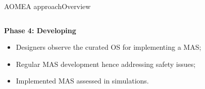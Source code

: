 \begin{frame}{AOMEA approach}{Overview}

    \begin{columns}

        \begin{column}{0.6\textwidth}

            \textbf{Phase 4: Developing}

            \begin{itemize}
                \item Designers observe the curated OS for implementing a MAS;
                \item Regular MAS development hence addressing safety issues;
                \item Implemented MAS assessed in simulations.
            \end{itemize}

        \end{column}

        \begin{column}{0.4\textwidth}
            \centering
        \end{column}


\end{columns}
\end{frame}
